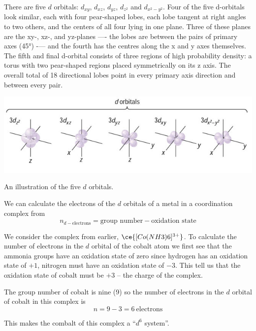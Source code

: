 \documentclass[../mit-general-chemistry.tex]{subfiles}
\begin{document}
There are five $d$ orbitals: $d_{xy}$, $d_{xz}$, $d_{yz}$, $d_{z^2}$
and $d_{x^2-y^2}$. Four of the five d-orbitals look similar, each with
four pear-shaped lobes, each lobe tangent at right angles to two
others, and the centers of all four lying in one plane. Three of these
planes are the xy-, xz-, and yz-planes —- the lobes are between the
pairs of primary axes (\ang{45}) -— and the fourth has the centres
along the x and y axes themselves. The fifth and final d-orbital
consists of three regions of high probability density: a torus with
two pear-shaped regions placed symmetrically on its z axis. The
overall total of 18 directional lobes point in every primary axis
direction and between every pair.



\begin{hfigure}
  \begin{center}
    \includegraphics[width=\textwidth]{d-orbitals}
  \end{center}
  \caption{An illustration of the five $d$ orbitals.}
\end{hfigure}



We can calculate the electrons of the $d$ orbitals of a metal in a
coordination complex from
\begin{equation}
  n_{d-\text{electrons}} = \text{group number} - \text{oxidation state}
\end{equation}


\begin{example}
  We consider the complex from earlier, $\ce{[Co(NH3)6]^{3+}}$. To
  calculate the number of electrons in the $d$ orbital of the cobalt
  atom we first see that the ammonia groups have an oxidation state of
  zero since hydrogen has an oxidation state of $+1$, nitrogen must have
  an oxidation state of $-3$. This tell us that the oxidation state of
  cobalt must be $+3$ -- the charge of the complex.

  The group number of cobalt is nine (9) so the number of electrons in
  the $d$ orbital of cobalt in this complex is
  \begin{equation*}
    n = 9 - 3 = 6~\text{electrons}
  \end{equation*}

  This makes the combalt of this complex a ``$d^6$ system''.
\end{example}
\end{document}
